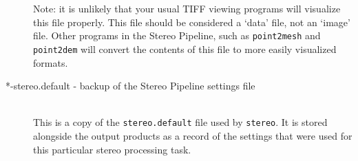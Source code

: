 \begin{description}
  Note: it is unlikely that your usual TIFF viewing programs will
  visualize this file properly.  This file should be considered a
  `data' file, not an `image' file.  Other programs in the Stereo
  Pipeline, such as {\tt point2mesh} and {\tt point2dem} will convert
  the contents of this file to more easily visualized formats.

\item[*-stereo.default \textnormal{- backup of the Stereo Pipeline settings file}] \hfill \\
  This is a copy of the \texttt{stereo.default} file used by
  \texttt{stereo}.  It is stored alongside the output products as
  a record of the settings that were used for this particular stereo
  processing task.

\end{description}

